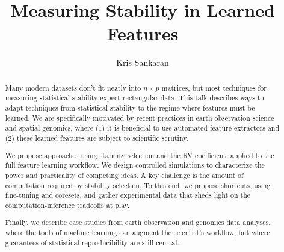 \documentclass[11pt]{article}
\title{Measuring Stability in Learned Features}
\author{Kris Sankaran}
\begin{document}
\maketitle

\begin{abstract}
Many modern datasets don't fit neatly into $n \times p$ matrices, but most
techniques for measuring statistical stability expect rectangular data. This
talk describes ways to adapt techniques from statistical stability to the regime
where features must be learned. We are specifically motivated by recent
practices in earth observation science and spatial genomics, where (1) it is
beneficial to use automated feature extractors and (2) these learned features
are subject to scientific scrutiny.

We propose approaches using stability selection and the RV coefficient, applied
to the full feature learning workflow. We design controlled simulations to
characterize the power and practicality of competing ideas. A key challenge is
the amount of computation required by stability selection. To this end, we
propose shortcuts, using fine-tuning and coresets, and gather experimental data
that sheds light on the computation-inference tradeoffs at play.

Finally, we describe case studies from earth observation and genomics data
analyses, where the tools of machine learning can augment the scientist's
workflow, but where guarantees of statistical reproducibility are still central.
\end{abstract}
\end{document}
